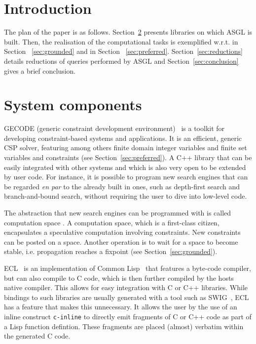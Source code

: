 \documentclass[runningheads,a4paper]{llncs}
\begin{document}
\section{Introduction}\label{sec:introduction}

The plan of the paper is as follows. Section~\ref{sec:components}
presents libraries on which ASGL is built. Then, the realisation of
the computational tasks is exemplified w.r.t. \grsem{} in Section~
\ref{sec:grounded} and \prsem{} in Section~
\ref{sec:preferred}. Section~\ref{sec:reductions} details reductions
of queries performed by ASGL and Section~\ref{sec:conclusion} gives
a brief conclusion.

\section{System components}\label{sec:components}

GECODE (generic constraint development environment)~\cite{gecode} is a
toolkit for developing constraint-based systems and applications. It
is an efficient, generic CSP solver, featuring among others finite
domain integer variables and finite set variables and constraints (see
Section~\ref{sec:preferred}). A C++ library that can be easily
integrated with other systems and which is also very open to be
extended by user code. For instance, it is possible to program new
search engines that can be regarded \textit{en par} to the already
built in ones, such as depth-first search and branch-and-bound search,
without requiring the user to dive into low-level code.

The abstraction that new search engines can be programmed with is
called computation space \cite{Engines:97}. A computation space, which
is a first-class citizen, encapsulates a speculative computation
involving constraints. New constraints can be posted on a
space. Another operation is to wait for a space to become stable,
i.e. propagation reaches a fixpoint (see Section~\ref{sec:grounded}).

ECL~\cite{ecl} is an implementation of Common
Lisp~\cite{Steele:1990:CLL} that features a byte-code compiler, but
can also compile to C code, which is then further compiled by the
hosts native compiler. This allows for easy integration with C or C++
libraries. While bindings to such libraries are usually generated with
a tool such as SWIG~\cite{swig}, ECL has a feature that makes this
unnecessary. It allows the user by the use of an inline construct
\texttt{c-inline} to directly emit fragments of C or C++ code as part
of a Lisp function defintion. These fragments are placed (almost)
verbatim within the generated C code.
\end{document}
